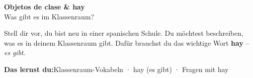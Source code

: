 \documentclass[11pt, a4paper]{article}
\newcommand{\seriftext}[1]{{\fontfamily{ppl}\selectfont #1}}
\newcommand{\thema}{Objetos de clase \& hay}
\newcommand{\untertitel}{Was gibt es im Klassenraum?}
\newcommand{\lernziele}{Klassenraum-Vokabeln · hay (es gibt) · Fragen mit hay}
\newcommand{\es}[1]{\seriftext{\textbf{#1}}}
\newcommand{\de}[1]{\textit{\textcolor{akzent}{#1}}}
\begin{document}
\begin{center}
    {\LARGE\bfseries \thema}\\[3pt]
    {\small \untertitel}
\end{center}

\vspace{4pt}

Stell dir vor, du bist neu in einer spanischen Schule. Du möchtest beschreiben, was es in deinem Klassenraum gibt. Dafür brauchst du das wichtige Wort \es{hay} -- \de{es gibt}.

\vspace{2pt}

\begin{lernzielbox}
\textbf{Das lernst du:}\quad \lernziele
\end{lernzielbox}

\end{document}
